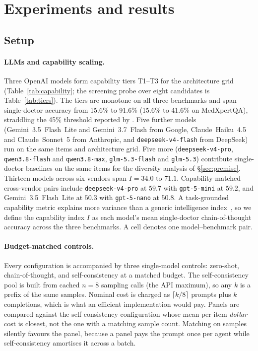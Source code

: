 \section{Experiments and results}

\subsection{Setup}

\paragraph{LLMs and capability scaling.}

Three OpenAI models form capability tiers T1--T3 for the architecture grid
(Table~\ref{tab:capability}; the screening probe over eight candidates is
Table~\ref{tab:tiers}). The tiers are monotone on all three benchmarks and span
single-doctor accuracy from 15.6\% to 91.6\% (15.6\% to 41.6\% on MedXpertQA), straddling the
45\% threshold reported by \citet{kim2026scaling}. Five further models (Gemini~3.5~Flash~Lite and Gemini~3.7~Flash from
Google, Claude~Haiku~4.5 and Claude~Sonnet~5 from Anthropic, and
\texttt{deepseek-v4-flash} from DeepSeek) run on the same items and architecture grid.
Five more (\texttt{deepseek-v4-pro}, \texttt{qwen3.8-flash} and \texttt{qwen3.8-max},
\texttt{glm-5.3-flash} and \texttt{glm-5.3}) contribute single-doctor baselines on the same
items for the diversity analysis of \S\ref{sec:premise}. Thirteen models across six vendors span
$I = 34.0$ to $71.1$. Capability-matched cross-vendor pairs include
\texttt{deepseek-v4-pro} at $59.7$ with \texttt{gpt-5-mini} at $59.2$, and
Gemini~3.5~Flash~Lite at $50.3$ with \texttt{gpt-5-nano} at $50.8$.
A task-grounded capability metric explains more variance than a generic
intelligence index~\citep{kim2026scaling}, so we define the capability index $I$ as each model's
mean single-doctor chain-of-thought accuracy across the three benchmarks. A cell denotes one
model--benchmark pair.




\paragraph{Budget-matched controls.}

Every configuration is accompanied by three single-model controls: zero-shot,
chain-of-thought, and self-consistency at a matched budget. The self-consistency pool is built from cached
$n{=}8$ sampling calls (the API maximum), so any $k$ is a prefix of the same samples. Nominal cost
is charged as $\lceil k/8 \rceil$ prompts plus $k$ completions, which is what an efficient
implementation would pay. Panels are compared against the self-consistency configuration whose
mean per-item \emph{dollar} cost is closest, not the one with a matching sample count. Matching on
samples silently favours the panel, because a panel pays the prompt once per agent while
self-consistency amortises it across a batch.

